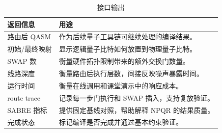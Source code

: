 \begin{table}[H]
  \centering
  \caption{接口输出}
  \label{tab:interface-outputs}
  \begin{tabularx}{\linewidth}{lY}
    \toprule
    返回信息 & 用途 \\
    \midrule
    路由后 QASM & 作为后续量子工具链可继续处理的编译结果。\\
    初始/最终映射 & 显示逻辑量子比特如何放置到物理量子比特。\\
    SWAP 数 & 衡量硬件拓扑限制带来的额外交换门数量。\\
    线路深度 & 衡量路由后执行层数，间接反映噪声暴露时间。\\
    运行时间 & 衡量在线调用和课堂演示中的响应成本。\\
    route trace & 记录每一步门执行和 SWAP 插入，支持复放验证。\\
    SABRE 指标 & 提供固定基线对照，帮助解释 NPQR 的结果质量。\\
    完成状态 & 标记编译是否完成并通过基本约束验证。\\
    \bottomrule
  \end{tabularx}
\end{table}
